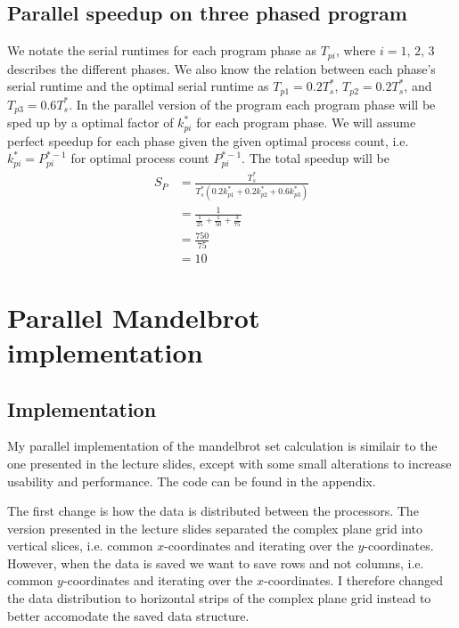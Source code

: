 \documentclass{article}
\begin{document}
\subsection{Parallel speedup on three phased program}
We notate the serial runtimes for each program phase as $T_{pi}$,
where $i=1,\,2,\,3$ describes the different phases.
We also know the relation between each phase's serial runtime and the optimal serial runtime
as $T_{p1} = 0.2T^*_s$, $T_{p2} = 0.2T^*_s$, and $T_{p3} = 0.6T^*_s$.
In the parallel version of the program each program phase will be sped up by a optimal
factor of $k^*_{pi}$ for each program phase.
We will assume perfect speedup for each phase given the given optimal process count,
i.e. $k^*_{pi} = P^{*-1}_{pi}$ for optimal process count $P^{*-1}_{pi}$.
The total speedup will be
\begin{equation}
  \begin{aligned}
    S_P
    &= \frac{T^*_s}{T^*_s\left( 0.2k^*_{p1} + 0.2k^*_{p2} + 0.6k^*_{p3} \right)} \\
    &= \frac{1}{\frac{1}{25} + \frac{1}{50} + \frac{3}{75}} \\
    &= \frac{750}{75} \\
    &= 10
  \end{aligned}
\end{equation}

\section{Parallel Mandelbrot implementation}

\subsection*{Implementation}
My parallel implementation of the mandelbrot set calculation is similair to the one
presented in the lecture slides,
except with some small alterations to increase usability and performance.
The code can be found in the appendix.

The first change is how the data is distributed between the processors.
The version presented in the lecture slides separated the complex plane grid into vertical slices,
i.e. common $x$-coordinates and iterating over the $y$-coordinates.
However, when the data is saved we want to save rows and not columns,
i.e. common $y$-coordinates and iterating over the $x$-coordinates.
I therefore changed the data distribution to horizontal strips of the complex plane grid instead
to better accomodate the saved data structure.
\end{document}

